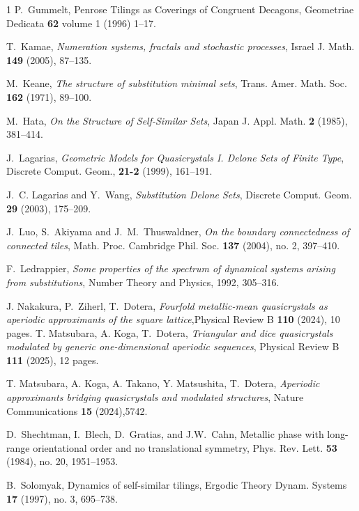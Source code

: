 \documentclass[a4]{amsart}
\theoremstyle{definition}
\begin{document}
\begin{thebibliography}{1}
P.~Gummelt, 
Penrose Tilings as Coverings of Congruent
Decagons, Geometriae Dedicata 
\textbf{62} volume 1 (1996) 1--17.

T.~Kamae, \emph{Numeration systems, fractals and stochastic processes},
Israel J. Math. \textbf{149} (2005), 87--135.

M.~Keane, \emph{The structure of substitution minimal sets}, Trans. Amer. Math. Soc. \textbf{162} (1971), 89--100.


M.~Hata,
\emph{On the Structure of Self-Similar Sets},
Japan J. Appl. Math. \textbf{2} (1985), 381--414.

J.~Lagarias, \emph{Geometric Models for Quasicrystals {I}. {D}elone Sets of Finite Type},
Discrete Comput. Geom., \textbf{21-2} (1999), 161--191.

J.~C. Lagarias and Y.~Wang, \emph{Substitution {D}elone {S}ets}, Discrete
  Comput. Geom. \textbf{29} (2003), 175--209.

J.~Luo, S.~Akiyama and J.~M.~Thuswaldner, \emph{On the boundary connectedness of connected tiles},
Math. Proc. Cambridge Phil. Soc. \textbf{137} (2004), no. 2, 397--410.

F.~Ledrappier, \textit{Some properties of the spectrum of dynamical systems arising from substitutions}, Number Theory and Physics, 1992, 305--316.

J. Nakakura, P.~Ziherl, T.~Dotera, \emph{Fourfold metallic-mean quasicrystals as aperiodic approximants of the square lattice},Physical Review B \textbf{110} (2024), 10 pages.
T. Matsubara, A. Koga, T.~Dotera, \emph{Triangular and dice quasicrystals modulated by generic one-dimensional aperiodic sequences}, Physical Review B \textbf{111} (2025), 12 pages.

T. Matsubara, A. Koga, A. Takano, Y. Matsushita, T.~Dotera, \emph{Aperiodic approximants bridging quasicrystals and modulated structures}, Nature Communications \textbf{15} (2024),5742.



D.~Shechtman, I.~Blech, D.~Gratias, and J.W.~Cahn, 
Metallic phase with long-range orientational order and no
translational symmetry, Phys. Rev. Lett. \textbf{53} (1984), no. 20, 1951--1953.

B.~Solomyak, Dynamics of self-similar tilings, Ergodic Theory Dynam. Systems \textbf{17}
(1997), no. 3, 695--738.


\end{thebibliography}
\end{document}
